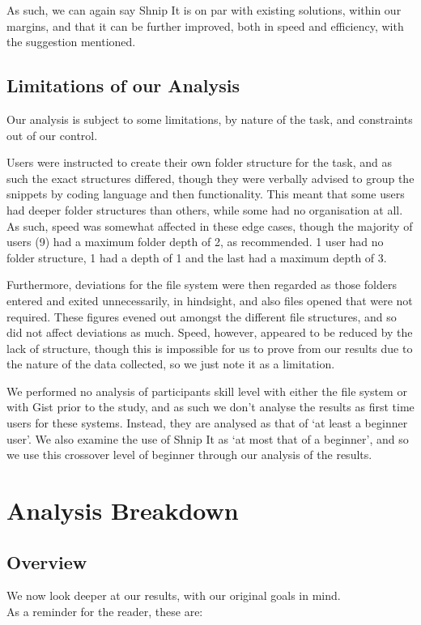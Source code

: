 As such, we can again say Shnip It is on par with existing solutions, within our margins, and that it can be further improved, both in speed and efficiency, with the suggestion mentioned.

\subsection{Limitations of our Analysis}
Our analysis is subject to some limitations, by nature of the task, and constraints out of our control.

Users were instructed to create their own folder structure for the task, and as such the exact structures differed, though they were verbally advised to group the snippets by coding language and then functionality. 
This meant that some users had deeper folder structures than others, while some had no organisation at all. 
As such, speed was somewhat affected in these edge cases, though the majority of users (9) had a maximum folder depth of 2, as recommended. 1 user had no folder structure, 1 had a depth of 1 and the last had a maximum depth of 3.

Furthermore, deviations for the file system were then regarded as those folders entered and exited unnecessarily, in hindsight, and also files opened that were not required.
These figures evened out amongst the different file structures, and so did not affect deviations as much.
Speed, however, appeared to be reduced by the lack of structure, though this is impossible for us to prove from our results due to the nature of the data collected, so we just note it as a limitation.

We performed no analysis of participants skill level with either the file system or with Gist prior to the study, and as such we don't analyse the results as first time users for these systems. 
Instead, they are analysed as that of `at least a beginner user'.
We also examine the use of Shnip It as `at most that of a beginner', and so we use this crossover level of beginner through our analysis of the results.

\section{Analysis Breakdown}
\subsection{Overview}
We now look deeper at our results, with our original goals in mind.\\
As a reminder for the reader, these are:

